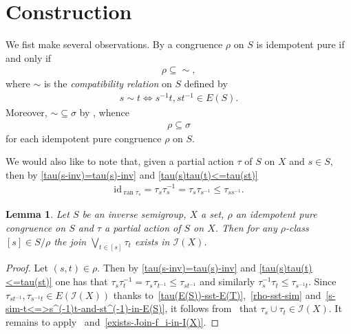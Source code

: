 \documentclass[reqno]{amsart}
\newtheorem{lem}[thrm]{Lemma}
\theoremstyle{definition}
\renewcommand{\iff}{\Leftrightarrow}
\newcommand{\id}{\mathrm{id}}
\newcommand{\cI}[1]{\mathcal I{(#1)}}
\newcommand{\ran}[1]{\operatorname{\mathrm{ran}}{#1}}
\newcommand{\m}{{}^{-1}}
\newcommand{\0}{\theta}
\newcommand{\sst}{\subseteq}
\newcommand{\Jn}{\bigvee}
\begin{document}
\section{Construction}

We fist make several observations. By \cite[Proposition 2.4.5]{Lawson} a congruence $\rho$ on $S$ is idempotent pure if and only if
\begin{align}\label{rho-sst-sim}
\rho\sst\sim,
\end{align}
where $\sim$ is the \emph{compatibility relation} on $S$ defined by 
\begin{align}\label{s-sim-t<=>s^(-1)t-and-st^(-1)-in-E(S)}
s\sim t\iff s\m t,st\m\in E(S).
\end{align}
Moreover, $\sim\sst\sigma$ by \cite[Theorem 2.4.1 (1)]{Lawson}, whence
\begin{align}\label{rho-sst-sigma}
\rho\sst\sigma
\end{align}
for each idempotent pure congruence $\rho$ on $S$.

We would also like to note that, given a partial action $\tau$ of $S$ on $X$ and $s\in S$, then by \ref{tau(s-inv)=tau(s)-inv} and \ref{tau(s)tau(t)<=tau(st)}
\begin{align}\label{id_ran-tau_s-sst-tau_ss^(-1)}
\id_{\ran{\tau_s}}=\tau_s\tau\m_s=\tau_s\tau_{s\m}\le\tau_{ss\m}.
\end{align}

\begin{lem}\label{corr-of-tau-tilde}
	Let $S$ be an inverse semigroup, $X$ a set, $\rho$ an idempotent pure congruence on $S$ and $\tau$ a partial action of $S$ on $X$. Then for any $\rho$-class $[s]\in S/\rho$ the join $\Jn_{t\in[s]}\tau_t$ exists in $\cI X$.
\end{lem}
\begin{proof}
	Let $(s,t)\in\rho$. Then by \ref{tau(s-inv)=tau(s)-inv} and \ref{tau(s)tau(t)<=tau(st)} one has that $\tau_s\tau\m_t=\tau_s\tau_{t\m}\le\tau_{st\m}$ and similarly $\tau\m_s\tau_t\le\tau_{s\m t}$. Since $\tau_{st\m},\tau_{s\m t}\in E(\cI X)$ thanks to~\eqref{tau(E(S))-sst-E(T)},~\eqref{rho-sst-sim} and~\eqref{s-sim-t<=>s^(-1)t-and-st^(-1)-in-E(S)}, it follows from~\cite[Proposition~1.2.1~(2)]{Lawson} that $\tau_s\cup\tau_t\in \cI X$. It remains to apply~\cite[Proposition~1.2.1~(3)]{Lawson} and~\eqref{exists-Join-f_i-in-I(X)}.
\end{proof}
\end{document}
